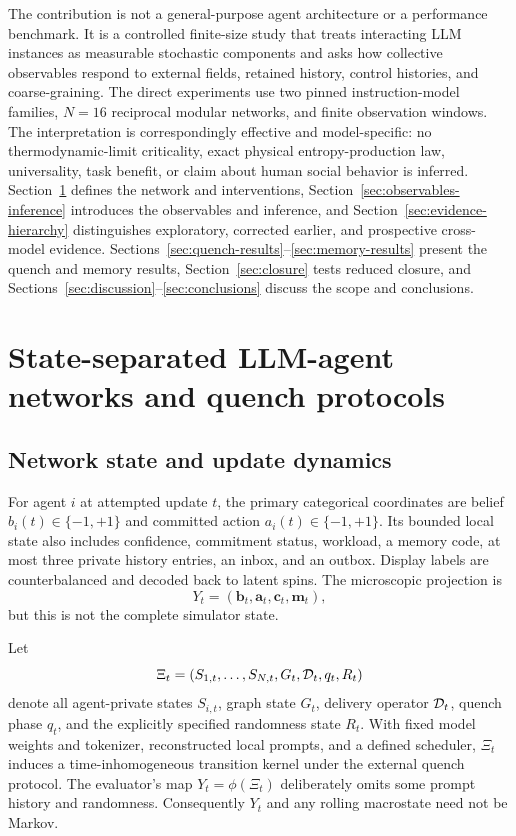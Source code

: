 \documentclass[12pt]{article}
\begin{document}
The contribution is not a general-purpose agent architecture or a performance
benchmark.  It is a controlled finite-size study that treats interacting LLM
instances as measurable stochastic components and asks how collective
observables respond to external fields, retained history, control histories,
and coarse-graining.  The direct experiments use two pinned instruction-model
families, $N=16$ reciprocal modular networks, and finite observation windows.
The interpretation is correspondingly effective and model-specific: no
thermodynamic-limit criticality, exact physical entropy-production law,
universality, task benefit, or claim about human social behavior is inferred.
Section~\ref{sec:system-protocol} defines the network and interventions,
Section~\ref{sec:observables-inference} introduces the observables and
inference, and Section~\ref{sec:evidence-hierarchy} distinguishes exploratory,
corrected earlier, and prospective cross-model evidence.  Sections~\ref{sec:quench-results}--\ref{sec:memory-results}
present the quench and memory results, Section~\ref{sec:closure} tests reduced
closure, and Sections~\ref{sec:discussion}--\ref{sec:conclusions} discuss the
scope and conclusions.

\section{State-separated LLM-agent networks and quench protocols}
\label{sec:system-protocol}

\subsection{Network state and update dynamics}
\label{sec:state}

For agent $i$ at attempted update $t$, the primary categorical coordinates are
belief $b_i(t)\in\{-1,+1\}$ and committed action
$a_i(t)\in\{-1,+1\}$.  Its bounded local state also includes confidence,
commitment status, workload, a memory code, at most three private history
entries, an inbox, and an outbox.  Display labels are counterbalanced and
decoded back to latent spins.  The microscopic projection is
\begin{equation}
Y_t=(\bm b_t,\bm a_t,\bm c_t,\bm m_t),
\end{equation}
but this is not the complete simulator state.

Let
\begin{equation}
\Xi_t=(S_{1,t},\ldots,S_{N,t},G_t,{\cal D}_t,q_t,R_t)
\end{equation}
denote all agent-private states $S_{i,t}$, graph state $G_t$, delivery operator
${\cal D}_t$, quench phase $q_t$, and the explicitly specified randomness
state $R_t$.  With fixed model weights and tokenizer, reconstructed local
prompts, and a defined scheduler, $\Xi_t$ induces a time-inhomogeneous
transition kernel under the external quench protocol.  The evaluator's map
$Y_t=\phi(\Xi_t)$ deliberately omits some prompt history and randomness.
Consequently $Y_t$ and any rolling macrostate need not be Markov.
\end{document}
